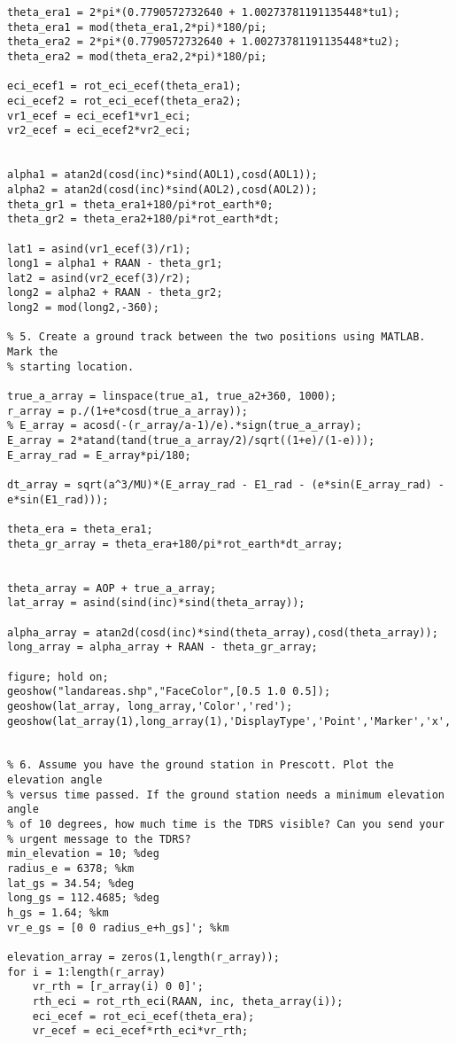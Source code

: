 \begin{lstlisting}[frame=lines,style=Matlab-editor,basicstyle = \mlttfamily]
theta_era1 = 2*pi*(0.7790572732640 + 1.00273781191135448*tu1);
theta_era1 = mod(theta_era1,2*pi)*180/pi;
theta_era2 = 2*pi*(0.7790572732640 + 1.00273781191135448*tu2);
theta_era2 = mod(theta_era2,2*pi)*180/pi;

eci_ecef1 = rot_eci_ecef(theta_era1);
eci_ecef2 = rot_eci_ecef(theta_era2);
vr1_ecef = eci_ecef1*vr1_eci;
vr2_ecef = eci_ecef2*vr2_eci;


alpha1 = atan2d(cosd(inc)*sind(AOL1),cosd(AOL1));
alpha2 = atan2d(cosd(inc)*sind(AOL2),cosd(AOL2));
theta_gr1 = theta_era1+180/pi*rot_earth*0;
theta_gr2 = theta_era2+180/pi*rot_earth*dt;

lat1 = asind(vr1_ecef(3)/r1);
long1 = alpha1 + RAAN - theta_gr1;
lat2 = asind(vr2_ecef(3)/r2);
long2 = alpha2 + RAAN - theta_gr2;
long2 = mod(long2,-360);

% 5. Create a ground track between the two positions using MATLAB. Mark the
% starting location.

true_a_array = linspace(true_a1, true_a2+360, 1000);
r_array = p./(1+e*cosd(true_a_array));
% E_array = acosd(-(r_array/a-1)/e).*sign(true_a_array);
E_array = 2*atand(tand(true_a_array/2)/sqrt((1+e)/(1-e)));
E_array_rad = E_array*pi/180;

dt_array = sqrt(a^3/MU)*(E_array_rad - E1_rad - (e*sin(E_array_rad) - e*sin(E1_rad)));

theta_era = theta_era1;
theta_gr_array = theta_era+180/pi*rot_earth*dt_array;


theta_array = AOP + true_a_array;
lat_array = asind(sind(inc)*sind(theta_array));

alpha_array = atan2d(cosd(inc)*sind(theta_array),cosd(theta_array));
long_array = alpha_array + RAAN - theta_gr_array;

figure; hold on;
geoshow("landareas.shp","FaceColor",[0.5 1.0 0.5]);
geoshow(lat_array, long_array,'Color','red');
geoshow(lat_array(1),long_array(1),'DisplayType','Point','Marker','x','Markersize',20);


% 6. Assume you have the ground station in Prescott. Plot the elevation angle
% versus time passed. If the ground station needs a minimum elevation angle
% of 10 degrees, how much time is the TDRS visible? Can you send your
% urgent message to the TDRS?
min_elevation = 10; %deg
radius_e = 6378; %km
lat_gs = 34.54; %deg
long_gs = 112.4685; %deg
h_gs = 1.64; %km
vr_e_gs = [0 0 radius_e+h_gs]'; %km

elevation_array = zeros(1,length(r_array));
for i = 1:length(r_array)
    vr_rth = [r_array(i) 0 0]';
    rth_eci = rot_rth_eci(RAAN, inc, theta_array(i));
    eci_ecef = rot_eci_ecef(theta_era);
    vr_ecef = eci_ecef*rth_eci*vr_rth;


\end{lstlisting}
